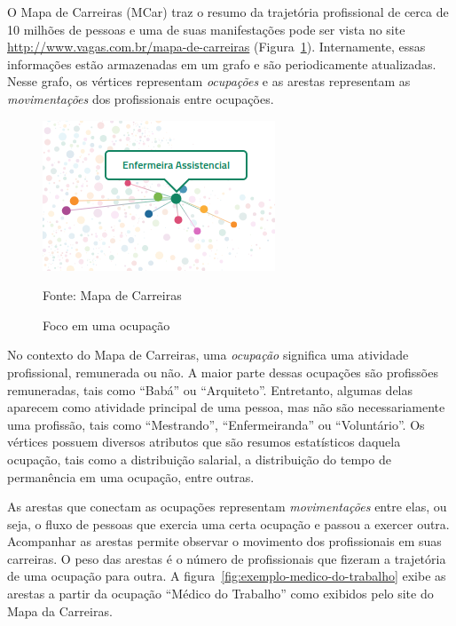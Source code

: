 \documentclass[12pt,a4paper,final]{article}
\newcommand{\source}[1]{\vspace{-10pt} \caption*{Fonte: {#1}} }
\begin{document}
O Mapa de Carreiras (MCar) traz o resumo da trajetória profissional de cerca de 10 milhões de pessoas e uma de suas manifestações pode ser vista no site \url{http://www.vagas.com.br/mapa-de-carreiras} (Figura~\ref{fig:exemplo-grafo}). Internamente, essas informações estão armazenadas em um grafo e são periodicamente atualizadas. Nesse grafo, os vértices representam \textit{ocupações} e as arestas representam as \textit{movimentações} dos profissionais entre ocupações.

\begin{figure}[ht]
  \centering
  \includegraphics[scale=0.8, frame]{mapa-enfermeira-assistencial.png}
  \caption{Foco em uma ocupação}
  \source{Mapa de Carreiras}
  \label{fig:exemplo-grafo}
\end{figure}


No contexto do Mapa de Carreiras, uma \textit{ocupação} significa uma atividade profissional, remunerada ou não. A maior parte dessas ocupações são profissões remuneradas, tais como \enquote{Babá} ou \enquote{Arquiteto}. Entretanto, algumas delas aparecem como atividade principal de uma pessoa, mas não são necessariamente uma profissão, tais como \enquote{Mestrando}, \enquote{Enfermeiranda} ou \enquote{Voluntário}. Os vértices possuem diversos atributos que são resumos estatísticos daquela ocupação, tais como a distribuição salarial, a distribuição do tempo de permanência em uma ocupação, entre outras.


As arestas que conectam as ocupações representam \textit{movimentações} entre elas, ou seja, o fluxo de pessoas que exercia uma certa ocupação e passou a exercer outra. Acompanhar as arestas permite observar o movimento dos profissionais em suas carreiras. O peso das arestas é o número de profissionais que fizeram a trajetória de uma ocupação para outra. A figura~\ref{fig:exemplo-medico-do-trabalho} exibe as arestas a partir da ocupação \enquote{Médico do Trabalho} como exibidos pelo site do Mapa da Carreiras.
\end{document}
